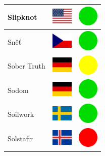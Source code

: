 \documentclass[12pt, a4paper, twoside]{report}
\begin{document}
\begin{center}
\begin{longtable}{|p{5cm}|p{2cm}|p{2cm}|}
 Slipknot                                                   & \includegraphics[width=1cm]{../4x3/us} &   \includegraphics[width=1cm]{../likes/y} \\ \hline
 Sněť                                                       & \includegraphics[width=1cm]{../4x3/cz} &   \includegraphics[width=1cm]{../likes/y} \\ \hline
 Sober Truth                                                & \includegraphics[width=1cm]{../4x3/de} &   \includegraphics[width=1cm]{../likes/m} \\ \hline
 Sodom                                                      & \includegraphics[width=1cm]{../4x3/de} &   \includegraphics[width=1cm]{../likes/y} \\ \hline
 Soilwork                                                   & \includegraphics[width=1cm]{../4x3/se} &   \includegraphics[width=1cm]{../likes/y} \\ \hline
 Solstafir                                                  & \includegraphics[width=1cm]{../4x3/is} &   \includegraphics[width=1cm]{../likes/n} \\ \hline

\end{longtable}
\end{center}
\end{document}
